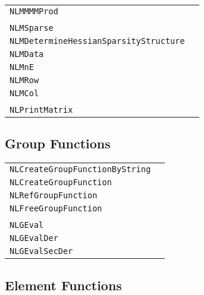 \documentclass[12pt]{article}
\begin{document}
\begin{center}
\begin{tabular}{ll}
\tt NLMMMMProd&\pageref{Subroutine:NLMMMMProd}\\
\\
\tt NLMSparse&\pageref{Subroutine:NLMSparse}\\
\tt NLMDetermineHessianSparsityStructure&\pageref{Subroutine:NLMDetermineHessianSparsityStructure}\\
\tt NLMData&\pageref{Subroutine:NLMData}\\
\tt NLMnE&\pageref{Subroutine:NLMnE}\\
\tt NLMRow&\pageref{Subroutine:NLMRow}\\
\tt NLMCol&\pageref{Subroutine:NLMCol}\\
\\
\tt NLPrintMatrix&\pageref{Subroutine:NLPrintMatrix}\\
\end{tabular}
\end{center}

\subsection{Group Functions}

\begin{center}
\begin{tabular}{ll}
\tt NLCreateGroupFunctionByString&\pageref{Subroutine:NLCreateGroupFunctionByString}\\
\tt NLCreateGroupFunction&\pageref{Subroutine:NLCreateGroupFunction}\\
\tt NLRefGroupFunction&\pageref{Subroutine:NLRefGroupFunction}\\
\tt NLFreeGroupFunction&\pageref{Subroutine:NLFreeGroupFunction}\\
\\
\tt NLGEval&\pageref{Subroutine:NLGEval}\\
\tt NLGEvalDer&\pageref{Subroutine:NLGEvalDer}\\
\tt NLGEvalSecDer&\pageref{Subroutine:NLGEvalSecDer}\\
\end{tabular}
\end{center}

\subsection{Element Functions}
\end{document}
